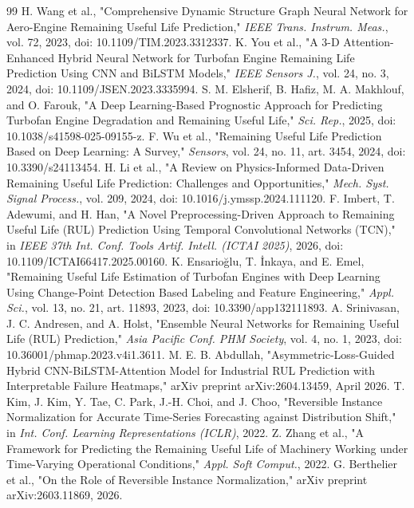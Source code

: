 \documentclass[review,12pt]{elsarticle}
\begin{document}
\begin{thebibliography}{99}
  H. Wang et al., "Comprehensive Dynamic Structure Graph Neural Network for Aero-Engine Remaining Useful Life Prediction," \textit{IEEE Trans. Instrum. Meas.}, vol. 72, 2023, doi: 10.1109/TIM.2023.3312337.
  K. You et al., "A 3-D Attention-Enhanced Hybrid Neural Network for Turbofan Engine Remaining Life Prediction Using CNN and BiLSTM Models," \textit{IEEE Sensors J.}, vol. 24, no. 3, 2024, doi: 10.1109/JSEN.2023.3335994.
  S. M. Elsherif, B. Hafiz, M. A. Makhlouf, and O. Farouk, "A Deep Learning-Based Prognostic Approach for Predicting Turbofan Engine Degradation and Remaining Useful Life," \textit{Sci. Rep.}, 2025, doi: 10.1038/s41598-025-09155-z.
  F. Wu et al., "Remaining Useful Life Prediction Based on Deep Learning: A Survey," \textit{Sensors}, vol. 24, no. 11, art. 3454, 2024, doi: 10.3390/s24113454.
  H. Li et al., "A Review on Physics-Informed Data-Driven Remaining Useful Life Prediction: Challenges and Opportunities," \textit{Mech. Syst. Signal Process.}, vol. 209, 2024, doi: 10.1016/j.ymssp.2024.111120.
  F. Imbert, T. Adewumi, and H. Han, "A Novel Preprocessing-Driven Approach to Remaining Useful Life (RUL) Prediction Using Temporal Convolutional Networks (TCN)," in \textit{IEEE 37th Int. Conf. Tools Artif. Intell. (ICTAI 2025)}, 2026, doi: 10.1109/ICTAI66417.2025.00160.
  K. Ensarioğlu, T. İnkaya, and E. Emel, "Remaining Useful Life Estimation of Turbofan Engines with Deep Learning Using Change-Point Detection Based Labeling and Feature Engineering," \textit{Appl. Sci.}, vol. 13, no. 21, art. 11893, 2023, doi: 10.3390/app132111893.
  A. Srinivasan, J. C. Andresen, and A. Holst, "Ensemble Neural Networks for Remaining Useful Life (RUL) Prediction," \textit{Asia Pacific Conf. PHM Society}, vol. 4, no. 1, 2023, doi: 10.36001/phmap.2023.v4i1.3611.
  M. E. B. Abdullah, "Asymmetric-Loss-Guided Hybrid CNN-BiLSTM-Attention Model for Industrial RUL Prediction with Interpretable Failure Heatmaps," arXiv preprint arXiv:2604.13459, April 2026.
  T. Kim, J. Kim, Y. Tae, C. Park, J.-H. Choi, and J. Choo, "Reversible Instance Normalization for Accurate Time-Series Forecasting against Distribution Shift," in \textit{Int. Conf. Learning Representations (ICLR)}, 2022.
  Z. Zhang et al., "A Framework for Predicting the Remaining Useful Life of Machinery Working under Time-Varying Operational Conditions," \textit{Appl. Soft Comput.}, 2022.
  G. Berthelier et al., "On the Role of Reversible Instance Normalization," arXiv preprint arXiv:2603.11869, 2026.

\end{thebibliography}
\end{document}
